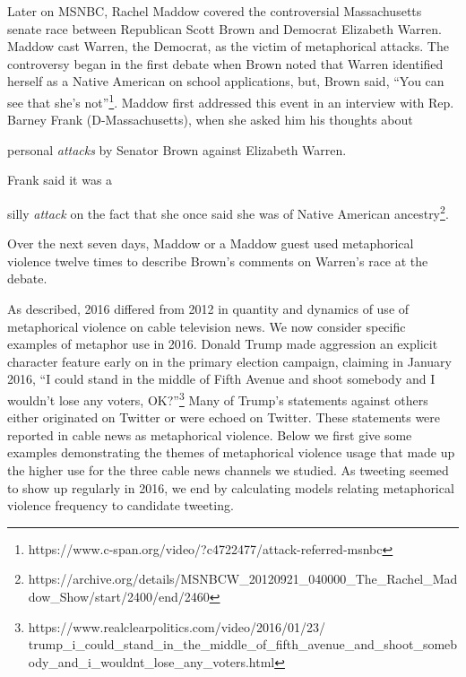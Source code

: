Later on MSNBC,
Rachel Maddow covered the controversial Massachusetts
senate race between Republican Scott Brown and Democrat Elizabeth Warren. 
Maddow cast Warren, the Democrat, as the victim of metaphorical attacks. 
The controversy began in the first debate when Brown noted 
that Warren identified herself as a 
Native American on school applications, but, Brown said, ``You can see that she's not''\footnote{\tiny https://www.c-span.org/video/?c4722477/attack-referred-msnbc}. 
Maddow first addressed this event in an interview with Rep. Barney 
Frank (D-Massachusetts), when she asked him his thoughts about 
\begin{exe}
  \ex personal \emph{attacks} by Senator Brown against Elizabeth Warren.
\end{exe}
Frank said it was a 
\begin{exe}
  \ex silly \emph{attack} on the fact that she once said she was of Native American 
  ancestry\footnote{\tiny https://archive.org/details/MSNBCW\_20120921\_040000\_The\_Rachel\_Maddow\_Show/start/2400/end/2460}.
\end{exe}
Over the next seven days, Maddow or a Maddow guest used metaphorical
violence twelve times to describe Brown's comments on Warren's race at the 
debate. 

As described, 2016 differed from 2012 in quantity and
dynamics of use of metaphorical violence on cable television news. 
We now consider specific examples of metaphor use in
2016.  Donald Trump made aggression an explicit character
feature early on in the primary election campaign, 
claiming in January 2016, ``I could stand in the middle of Fifth Avenue
and shoot somebody and I wouldn't lose any voters, OK?''\footnote{\tiny https://www.realclearpolitics.com/video/2016/01/23/\\trump\_i\_could\_stand\_in\_the\_middle\_of\_fifth\_avenue\_and\_shoot\_somebody\_and\_i\_wouldnt\_lose\_any\_voters.html}
Many of Trump's statements against others either originated on Twitter 
or were echoed on Twitter. These statements were reported in 
cable news as metaphorical violence. 
Below we first give some examples demonstrating the themes of metaphorical
violence usage that made up the higher use for the three cable 
news channels we studied. As tweeting seemed to show up
regularly in 2016, we end by calculating models relating
metaphorical violence frequency to candidate tweeting.

